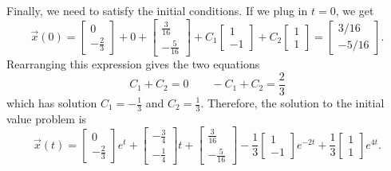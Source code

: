 \documentclass{ximera}
\begin{document}
\begin{exampleSol}
Finally, we need to satisfy the initial conditions. If we plug in $t=0$, we get
\begin{equation*}
    \vec{x}(0) = 
    \begin{bmatrix} 
        0 \\ 
        -\frac{2}{3} 
    \end{bmatrix} 
    + 0 + 
    \begin{bmatrix} 
        \frac{3}{16} \\ 
        -\frac{5}{16} 
    \end{bmatrix} 
    + C_1
    \begin{bmatrix} 
        1 \\ 
        -1 
    \end{bmatrix} 
    + C_2 
    \begin{bmatrix} 
        1 \\ 
        1 
    \end{bmatrix} 
    =
    \begin{bmatrix}
        3/16 \\
        -5/16
    \end{bmatrix}.
\end{equation*}
Rearranging this expression gives the two equations
\begin{equation*}
    C_1 + C_2 = 0 \qquad -C_1 + C_2 = \frac{2}{3}
\end{equation*}
which has solution $C_1 = -\frac{1}{3}$ and $C_2 = \frac{1}{3}$. Therefore, the solution to the initial value problem is
\begin{equation*}
    \vec{x}(t) = \begin{bmatrix} 0 \\ -\frac{2}{3} \end{bmatrix} e^t + \begin{bmatrix} -\frac{3}{4} \\ -\frac{1}{4} \end{bmatrix} t + \begin{bmatrix} \frac{3}{16} \\ -\frac{5}{16} \end{bmatrix} - \frac{1}{3}\begin{bmatrix} 1 \\ -1 \end{bmatrix}e^{-2t} + \frac{1}{3}\begin{bmatrix} 1 \\ 1 \end{bmatrix} e^{4t}.
\end{equation*}
\end{exampleSol}
\end{document}
